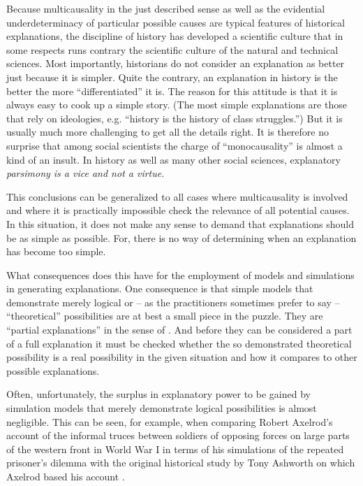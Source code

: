 \documentclass[onecollarge]{STJour}
\numberwithin{equation}{section}
\begin{document}
Because multicausality in the just described sense as well as the
evidential underdeterminacy of particular possible causes are typical
features of historical explanations, the discipline of history has
developed a scientific culture that in some respects runs contrary the
scientific culture of the natural and technical sciences. Most
importantly, historians do not consider an explanation as better just
because it is simpler. Quite the contrary, an explanation in history is
the better the more ``differentiated'' it is. The reason for this
attitude is that it is always easy to cook up a simple story. (The most
simple explanations are those that rely on ideologies, e.g. ``history is
the history of class struggles.'') But it is usually much more
challenging to get all the details right. It is therefore no surprise
that among social scientists the charge of ``monocausality'' is almost a
kind of an insult. In history as well as many other social sciences,
explanatory {\em parsimony is a vice and not a virtue}.

This conclusions can be generalized to all cases where multicausality is
involved and where it is practically impossible check the relevance of
all potential causes. In this situation, it does not make any sense to
demand that explanations should be as simple as possible. For, there is
no way of determining when an explanation has become too simple.

What consequences does this have for the employment of models and
simulations in generating explanations. One consequence is that simple
models that demonstrate merely logical or -- as the practitioners
sometimes prefer to say -- ``theoretical'' possibilities are at best
a small piece in the puzzle. They are ``partial explanations'' in the
sense of \citet{aydinonat:2007}. And before they can be
considered a part of a full explanation it must be checked whether the
so demonstrated theoretical possibility is a real possibility in the
given situation and how it compares to other possible explanations.

Often, unfortunately, the surplus in explanatory power to be gained by
simulation models that merely demonstrate logical possibilities is almost
negligible. This can be seen, for example, when comparing Robert
Axelrod's account of the informal truces between soldiers of opposing
forces on large parts of the western front in World War I in terms of his
simulations of the repeated prisoner's dilemma with the original
historical study by Tony Ashworth on which Axelrod based his account
\citep[p.\ 180-189]{arnold:2008}.
\end{document}
